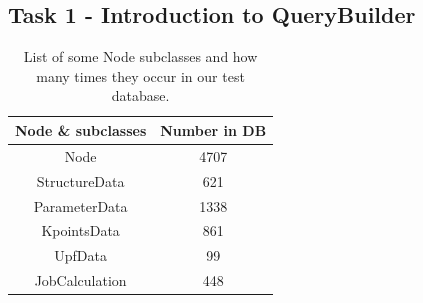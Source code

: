 

\subsection*{Task 1 - Introduction to QueryBuilder}
\begin{table}[b]
\centering
\begin{tabular}{cc}
\hline
Node \& subclasses & Number in DB \\ \hline
Node                 & 4707 \\
StructureData        & 621 \\
ParameterData        & 1338 \\
KpointsData          & 861 \\
UpfData              & 99 \\
JobCalculation       & 448 \\ \hline
\end{tabular}
\caption{List of some Node subclasses and how many times they occur in our test database.}
\label{fig.types}
\end{table}


